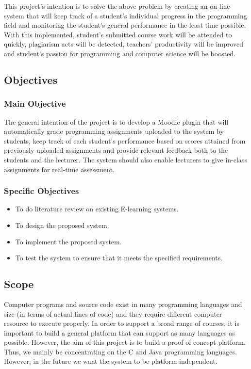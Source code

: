 \documentclass[12pt]{article}
\begin{document}
		\noindent This project's intention is to solve the above problem by creating an on-line system that will keep track of a student's individual progress in the programming field and monitoring the student's general performance in the least time possible. With this implemented, student's submitted course work will be attended to quickly, plagiarism acts will be detected, teachers' productivity will be improved and student's passion for programming and computer science will be boosted.
	\subsection{Objectives}
		\subsubsection{Main Objective}
		The general intention of the project is to develop a Moodle plugin that will automatically grade programming assignments uploaded to the system by students, keep track of each student’s performance based on scores attained from previously uploaded assignments and provide relevant feedback both to the students and the lecturer. The system should also enable lecturers to give in-class assignments for real-time assessment.
		\subsubsection{Specific Objectives}
		\begin{itemize}
			\item To do literature review on existing E-learning systems. 
			\item To design the proposed system.
			\item To implement the proposed system.
			\item To test the system to ensure that it meets the specified requirements.
		\end{itemize}
		
	\subsection{Scope}
		Computer programs and source code exist in many programming languages and size (in terms of actual lines of code) and they require different computer resource to execute properly. In order to support a broad range of courses, it is important to build a general platform that can support as many languages as possible. However, the aim of this project is to build a proof of concept platform. Thus, we mainly be concentrating on the C and Java programming languages.
		However, in the future we want the system to be platform independent. \\
		 
\end{document}
